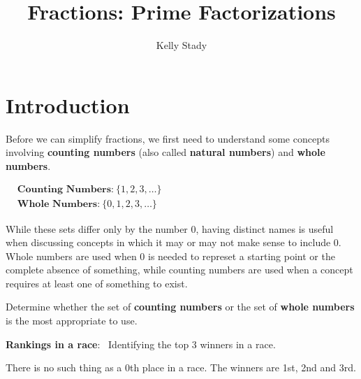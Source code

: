 \documentclass{ximera}[font=12pt]  %
\title{Fractions: Prime Factorizations}   %
\author{Kelly Stady}
\begin{document}
\begin{abstract}

\end{abstract}

\maketitle

\label{xim:FracsPrimeFac}

\section*{Introduction}

Before we can simplify fractions, we first need to understand some concepts involving \textbf{counting numbers} 
(also called \textbf{natural numbers}) and \textbf{whole numbers}.


\begin{flushleft}
\hspace{5em} %
$\begin{aligned}
& \textbf{Counting Numbers:} \ \{1, 2, 3, \dots\} \\[1.5ex]
& \textbf{Whole Numbers:} \ \{0, 1, 2, 3, \dots\}
\end{aligned}$
\end{flushleft}


While these sets differ only by the number 0, having distinct names is useful when discussing concepts in which it may or
may not make sense to include 0.  Whole numbers are used when 0 is needed to represet a starting point or the complete absence of something, 
while counting numbers are used when a concept requires at least one of something to exist.  


\begin{problem}  
Determine whether the set of \textbf{counting numbers} or the set of \textbf{whole numbers} is the most appropriate to use.

    \begin{center}
        \textbf{Rankings in a race}: \ Identifying the top 3 winners in a race.
    \end{center}

\begin{multipleChoice}
\end{multipleChoice}
\begin{feedback}
    There is no such thing as a 0th place in a race.  The winners are 1st, 2nd and 3rd.
\end{feedback}
\end{problem}
\end{document}
